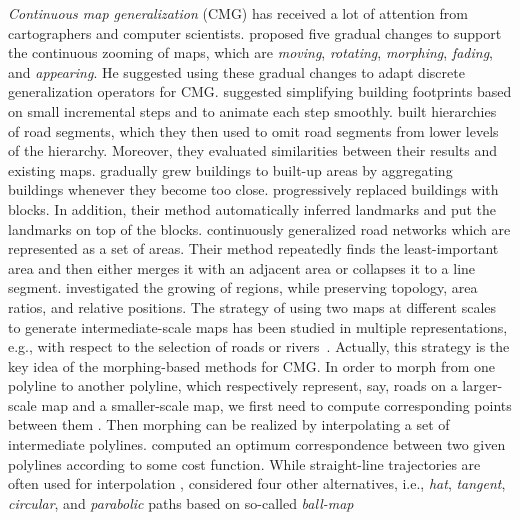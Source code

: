 \documentclass[acmsmall,natbib=false]{acmart}
\begin{document}
\emph{Continuous map generalization} (CMG)
has received a lot of attention
from cartographers and computer scientists.
\Textcite{vanKreveld2001} proposed five gradual changes
to support the continuous zooming of maps, 
which are \emph{moving}, \emph{rotating}, \emph{morphing}, 
\emph{fading}, and \emph{appearing}. 
He suggested using these gradual changes 
to adapt discrete generalization operators for CMG.
\textcite{Sester2005_CG} suggested simplifying building
footprints based on small incremental steps and 
to animate each step smoothly.
\textcite{Li2012Continuous} built hierarchies of road segments,
which they then used to omit road segments 
from lower levels of the hierarchy.
Moreover, they evaluated similarities 
between their results and existing maps.
\textcite{Peng2017Building} gradually grew
buildings to built-up areas by aggregating buildings 
whenever they become too close.
\textcite{Touya2017Progressive} progressively replaced
buildings with blocks. 
In addition, their method automatically inferred landmarks 
and put the landmarks on top of the blocks.
\textcite{Suba2016Road} continuously generalized road networks
which are represented as a set of areas.
Their method repeatedly finds the least-important area 
and then either merges it with an adjacent area 
or collapses it to a line segment.
\textcite{Danciger2009} investigated the growing of regions, 
while preserving topology, area ratios, and
relative positions.
The strategy of using two maps at different scales
to generate intermediate-scale maps has been studied in multiple
representations, e.g., with respect to the selection of roads or
rivers~\parencite{Peng2012River,Girres2014}. 
Actually, this strategy is the key idea of the
morphing-based methods for CMG.
In order to morph from one polyline to another polyline,
which respectively represent, say, roads on a larger-scale map 
and a smaller-scale map, we first need to compute 
corresponding points between them 
\parencite[e.g.,][]{Cecconi2003,Noellenburg2008,Chazal2010BallMap,
Deng2015,Li2017_Building,Li2017Annealing}.
Then morphing can be realized by interpolating a set of 
intermediate polylines.
\textcite{Noellenburg2008} computed an optimum
correspondence between two given polylines 
according to some cost function.
While straight-line trajectories 
are often used for interpolation
\parencite[e.g.,][]{Cecconi2003,Deng2015},
\textcite{Whited2011BallMorph} considered four other alternatives, 
i.e., \emph{hat}, \emph{tangent}, \emph{circular}, 
and \emph{parabolic} paths
based on so-called \emph{ball-map}
\end{document}
